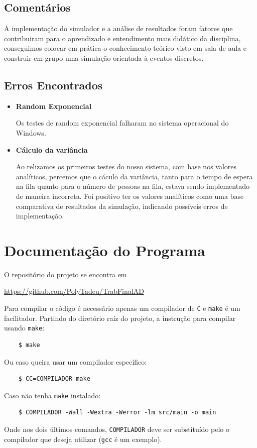 \documentclass[a4paper]{article}
\newcommand{\inlcode}{\texttt}
\newcommand{\lang}{\texttt}
\begin{document}
\subsection{Comentários}
A implementação do simulador e a análise de resultados foram
fatores que contribuiram para o aprendizado e entendimento
mais didático da disciplina,
conseguimos colocar em prática
o conhecimento teórico visto em sala de aula e construir
em grupo uma simulação orientada à eventos discretos.

\subsection{Erros Encontrados}
\begin{itemize}
    \item \textbf{Random Exponencial} \par
        Os testes de random exponencial falharam no sistema
        operacional do Windows.
    \item \textbf{Cálculo da variância} \par
        Ao relizamos os primeiros testes do nosso sistema,
        com base nos valores analíticos,
        percemos que o cáculo da variância,
        tanto para o tempo de espera na fila
        quanto para o número de pessoas na fila,
        estava sendo implementado de maneira incorreta.
        Foi positivo ter os valores analíticos
        como uma base comparativa de resultados da simulação,
        indicando possíveis erros de implementação.
\end{itemize}

\newpage
\section{Documentação do Programa}
O repositório do projeto se encontra em \par
\url{https://github.com/PolyTadeu/TrabFinalAD}

Para compilar o código é necessário apenas
um compilador de \lang{C}
e \inlcode{make} é um facilitador.
Partindo do diretório raíz do projeto,
a instrução para compilar usando \inlcode{make}:
\begin{verbatim}
    $ make
\end{verbatim}
Ou caso queira usar um compilador específico:
\begin{verbatim}
    $ CC=COMPILADOR make
\end{verbatim}
Caso não tenha \inlcode{make} instalado:
\begin{verbatim}
    $ COMPILADOR -Wall -Wextra -Werror -lm src/main -o main
\end{verbatim}
Onde nos dois últimos comandos,
\verb.COMPILADOR. deve ser substituído
pelo o compilador que deseja utilizar
(\inlcode{gcc} é um exemplo).
\end{document}
